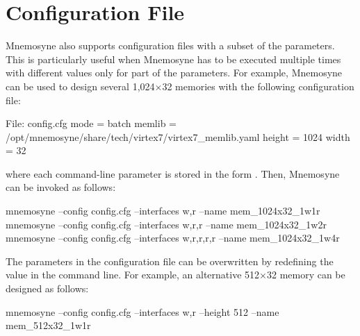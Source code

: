 \section{Configuration File}\label{sec:config}

{\sc Mnemosyne} also supports configuration files with a subset of the parameters. This is particularly useful when Mnemosyne has to be executed multiple times with different values only for part of the parameters. For example, {\sc Mnemosyne} can be used to design several 1,024$\times$32 memories with the following configuration file:

\begin{myxml}{File: config.cfg}
mode               = batch
memlib             = /opt/mnemosyne/share/tech/virtex7/virtex7_memlib.yaml
height             = 1024
width              = 32
\end{myxml}
\noindent where each command-line parameter is stored in the form . Then, {\sc Mnemosyne} can be invoked as follows:

\begin{commandshell}{}
  mnemosyne --config config.cfg --interfaces w,r --name mem_1024x32_1w1r
  mnemosyne --config config.cfg --interfaces w,r,r --name mem_1024x32_1w2r
  mnemosyne --config config.cfg --interfaces w,r,r,r,r --name mem_1024x32_1w4r
\end{commandshell}

The parameters in the configuration file can be overwritten by redefining the value in the command line. For example, an alternative 512$\times$32 memory can be designed as follows:
\begin{commandshell}{}
  mnemosyne --config config.cfg --interfaces w,r --height 512 --name mem_512x32_1w1r
\end{commandshell}



